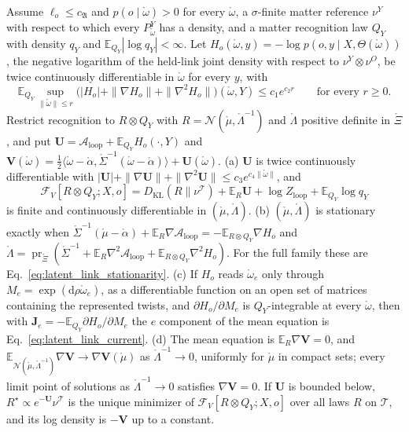 \begin{proposition}\label{prop:llp_field_equation}
Assume $\ell_o\leq c_{\mathfrak A}$ and $p(o\mid\mathring\omega)>0$ for every $\mathring\omega$, a $\sigma$-finite matter reference $\nu^Y$ with respect to which every $P^Y_{\mathring\omega}$ has a density, and a matter recognition law $Q_Y$ with density $q_Y$ and $\mathbb E_{Q_Y}|\log q_Y|<\infty$. Let $H_o(\mathring\omega,y)=-\log p(o,y\mid X,\Theta(\mathring\omega))$, the negative logarithm of the held-link joint density with respect to $\nu^Y\otimes\nu^O$, be twice continuously differentiable in $\mathring\omega$ for every $y$, with
\begin{equation}
\mathbb E_{Q_Y}\sup_{\|\mathring\omega\|\leq r}\bigl(|H_o|+\|\nabla H_o\|+\|\nabla^2H_o\|\bigr)(\mathring\omega,Y)\leq c_1e^{c_2r}\qquad\text{for every }r\geq0.
\label{eq:llp_matter_domination}
\end{equation}
Restrict recognition to $R\otimes Q_Y$ with $R=\mathcal N(\mathring\mu,\mathring\Lambda^{-1})$ and $\mathring\Lambda$ positive definite in $\mathring\Xi$, and put $\mathbf U=\mathcal A_{\mathrm{loop}}+\mathbb E_{Q_Y}H_o(\cdot,Y)$ and $\mathbf V(\mathring\omega)=\frac12\langle\mathring\omega-\mathring\alpha,\mathring\Sigma^{-1}(\mathring\omega-\mathring\alpha)\rangle+\mathbf U(\mathring\omega)$.
(a) $\mathbf U$ is twice continuously differentiable with $|\mathbf U|+\|\nabla\mathbf U\|+\|\nabla^2\mathbf U\|\leq c_3e^{c_4\|\mathring\omega\|}$, and
\begin{equation}
\mathcal F_V[R\otimes Q_Y;X,o]=D_{\mathrm{KL}}(R\|\nu^{\mathcal T})+\mathbb E_R\mathbf U+\log Z_{\mathrm{loop}}+\mathbb E_{Q_Y}\log q_Y
\label{eq:llp_field_free_energy}
\end{equation}
is finite and continuously differentiable in $(\mathring\mu,\mathring\Lambda)$.
(b) $(\mathring\mu,\mathring\Lambda)$ is stationary exactly when $\mathring\Sigma^{-1}(\mathring\mu-\mathring\alpha)+\mathbb E_R\nabla\mathcal A_{\mathrm{loop}}=-\mathbb E_{R\otimes Q_Y}\nabla H_o$ and $\mathring\Lambda=\operatorname{pr}_{\mathring\Xi}(\mathring\Sigma^{-1}+\mathbb E_R\nabla^2\mathcal A_{\mathrm{loop}}+\mathbb E_{R\otimes Q_Y}\nabla^2H_o)$. For the full family these are Eq.~\eqref{eq:latent_link_stationarity}.
(c) If $H_o$ reads $\mathring\omega_e$ only through $M_e=\exp(\mathrm d\rho\mathring\omega_e)$, as a differentiable function on an open set of matrices containing the represented twists, and $\partial H_o/\partial M_e$ is $Q_Y$-integrable at every $\mathring\omega$, then with $\mathbf J_e=-\mathbb E_{Q_Y}\partial H_o/\partial M_e$ the $e$ component of the mean equation is Eq.~\eqref{eq:latent_link_current}.
(d) The mean equation is $\mathbb E_R\nabla\mathbf V=0$, and $\mathbb E_{\mathcal N(\mathring\mu,\mathring\Lambda^{-1})}\nabla\mathbf V\to\nabla\mathbf V(\mathring\mu)$ as $\mathring\Lambda^{-1}\to0$, uniformly for $\mathring\mu$ in compact sets; every limit point of solutions as $\mathring\Lambda^{-1}\to0$ satisfies $\nabla\mathbf V=0$. If $\mathbf U$ is bounded below, $R^\star\propto e^{-\mathbf U}\nu^{\mathcal T}$ is the unique minimizer of $\mathcal F_V[R\otimes Q_Y;X,o]$ over all laws $R$ on $\mathcal T$, and its log density is $-\mathbf V$ up to a constant.
\end{proposition}


